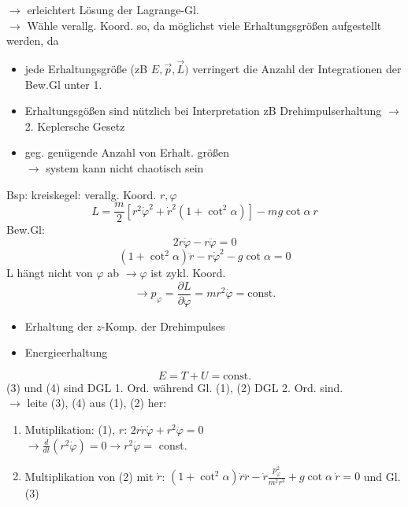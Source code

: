 \documentclass[titlepage,12pt,a4paper,ngerman]{report}
\newcommand{\tx}[1]{\textrm{#1}}
\newcommand{\const}{\tx{const.}}
\begin{document}
{$\rightarrow$ erleichtert Lösung der Lagrange-Gl.\\
$\rightarrow$ Wähle verallg. Koord. so, da möglichst viele Erhaltungsgrößen aufgestellt werden, da 
\begin{itemize}
	\item jede Erhaltungsgröße (zB $E, \vec{p},\vec{L})$ verringert die Anzahl der Integrationen der Bew.Gl unter 1.
	\item Erhaltungsgößen sind nützlich bei Interpretation zB Drehimpulserhaltung $\rightarrow$ 2. Keplersche Gesetz
	\item geg. genügende Anzahl von Erhalt. größen\\
	$\rightarrow$ system kann nicht chaotisch sein
\end{itemize}
Bsp: kreiskegel: verallg. Koord. $r, \varphi$ %
$$L = \frac{m}{2} [r^2 \dot \varphi^2 + \dot r^2 ( 1+ \cot^2 \alpha)] - mg \cot \alpha\ r$$
Bew.Gl: 
\begin{equation*}
2 \dot r \dot \varphi - r \ddot \varphi = 0 \tag{1}
\end{equation*}
\begin{equation*}
(1+ \cot^2 \alpha) \ddot r - r \dot \varphi^2 - g \cot \alpha = 0 \tag{2}
\end{equation*}
L hängt nicht von $\varphi$ ab $\rightarrow \varphi$ ist zykl. Koord.\\
\begin{equation*}
\rightarrow p_\varphi = \frac{\partial L }{\partial \varphi} = m r^2 \dot \varphi = \const \tag{3}
\end{equation*}
\begin{itemize}
	\item Erhaltung der $z$-Komp. der Drehimpulses
	\item Energieerhaltung
\end{itemize} 
\begin{equation*}
E = T + U = \tx{const.} \tag{4}
\end{equation*}
(3) und (4) sind DGL 1. Ord. während Gl. (1), (2) DGL 2. Ord. sind.\\
$\rightarrow$ leite (3), (4) aus (1), (2) her:
\begin{enumerate}
	\item Mutiplikation: (1), $r$: 	$2r \dot r \dot \varphi + r^2 \ddot \varphi = 0$\\
	$\rightarrow \frac{d}{dt}(r^2 \dot \varphi) = 0 \rightarrow r^2 \dot \varphi=$ const.
	\item Multiplikation von (2) mit $\dot r$: 	 $(1 + \cot^2 \alpha) \dot r \ddot r - \dot r \frac{p_\varphi^2}{m^2 r^3} + g \cot \alpha\ \dot r = 0$ und Gl. (3) 

\end{enumerate}}
\end{document}
